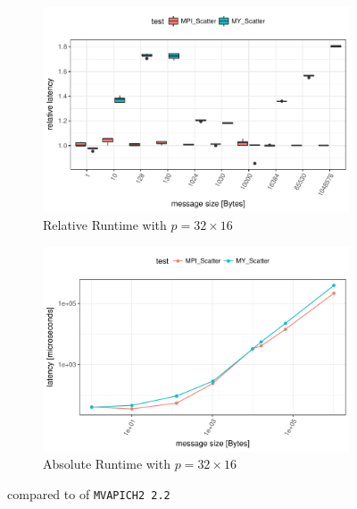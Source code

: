 \begin{figure}[h]
    \begin{subfigure}[b]{0.49\textwidth}
        \includegraphics[width=\textwidth]{../benchmarks/mpich/divide_conquer/scatter_32/rel_runtime.pdf}
        \caption{Relative Runtime with $p=32 \times 16$}
        \label{fig:Scatter:MPICH:Rel:32}
    \end{subfigure}
    \begin{subfigure}[b]{0.49\textwidth}
        \includegraphics[width=\textwidth]{../benchmarks/mpich/divide_conquer/scatter_32/runtime.pdf}
        \caption{Absolute Runtime with $p=32 \times 16$}
        \label{fig:Scatter:MPICH:Abs:32}
    \end{subfigure}
    
    \caption{\myscatter compared to \mpiscatter of \texttt{MVAPICH2 2.2}}
\end{figure}